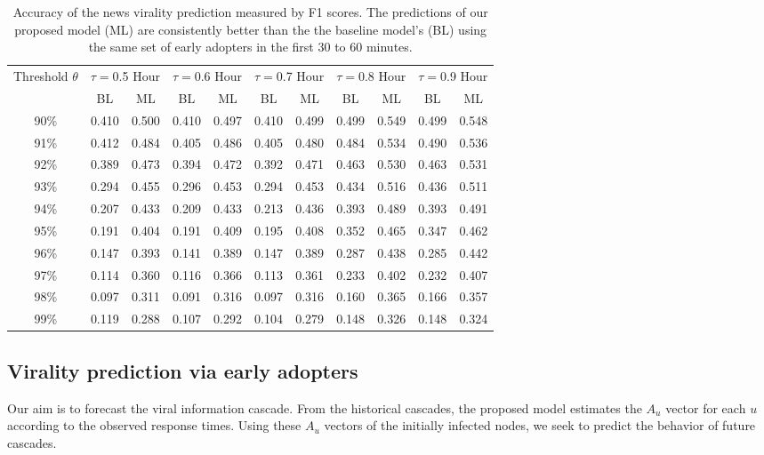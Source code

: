 \begin{table}[ht]
\caption{Accuracy of the news virality prediction measured by F1 scores. The predictions of our proposed model (ML) are consistently better than the the baseline model's (BL) using the same set of early adopters in the first 30 to 60 minutes.}
\centering
\label{tab:onehour}
\begin{tabular}{|c|c|c|c|c|c|c|c|c|c|c|}
\hline
\multirow{2}{*}{Threshold $\theta$} & \multicolumn{2}{c|}{$\tau=$0.5 Hour} & \multicolumn{2}{c|}{$\tau=$0.6 Hour} & \multicolumn{2}{c|}{$\tau=$0.7 Hour} & \multicolumn{2}{c|}{$\tau=$0.8 Hour} & \multicolumn{2}{c|}{$\tau=$0.9 Hour} \\ \cline{2-11}
& BL & ML & BL & ML & BL & ML & BL & ML & BL & ML \\
\hline 
\hline
90\% &  0.410 & 0.500 & 0.410 & 0.497  & 0.410 & 0.499  & 0.499 & 0.549  & 0.499 & 0.548   \\  
\hline
91\% &  0.412 & 0.484 & 0.405 & 0.486  & 0.405 & 0.480  & 0.484 & 0.534  & 0.490 & 0.536   \\
\hline
92\% &  0.389 & 0.473 & 0.394 & 0.472  & 0.392 & 0.471  & 0.463 & 0.530  & 0.463 & 0.531   \\
\hline
93\% &  0.294 & 0.455 & 0.296 & 0.453  & 0.294 & 0.453  & 0.434 & 0.516  & 0.436 & 0.511   \\
\hline
94\% &  0.207 & 0.433 & 0.209 & 0.433  & 0.213 & 0.436  & 0.393 & 0.489  & 0.393 & 0.491   \\
\hline
95\% &  0.191 & 0.404 & 0.191 & 0.409  & 0.195 & 0.408  & 0.352 & 0.465  & 0.347 & 0.462   \\
\hline
96\% &  0.147 & 0.393 & 0.141 & 0.389  & 0.147 & 0.389  & 0.287 & 0.438  & 0.285 & 0.442   \\
\hline
97\% &  0.114 & 0.360 & 0.116 & 0.366  & 0.113 & 0.361  & 0.233 & 0.402  & 0.232 & 0.407   \\
\hline
98\% &  0.097 & 0.311 & 0.091 & 0.316  & 0.097 & 0.316  & 0.160 & 0.365  & 0.166 & 0.357   \\
\hline
99\% &  0.119 & 0.288 & 0.107 & 0.292  & 0.104 & 0.279  & 0.148 & 0.326  & 0.148 & 0.324   \\
\hline
\end{tabular}
\end{table}


\subsection{Virality prediction via early adopters} \label{sec:forecast}
Our aim is to forecast the viral information cascade. From the historical cascades, the proposed model estimates the $A_u$ vector for each $u$ according to the observed response times. Using these $A_u$ vectors of the initially infected nodes, we seek to predict the behavior of future cascades.

